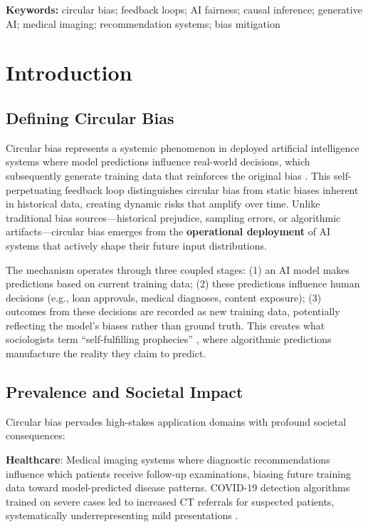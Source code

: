 \documentclass[11pt,a4paper]{article}
\begin{document}
\begin{abstract}
\end{abstract}

\noindent\textbf{Keywords:} circular bias; feedback loops; AI fairness; causal inference; generative AI; medical imaging; recommendation systems; bias mitigation

\section{Introduction}

\subsection{Defining Circular Bias}

Circular bias represents a systemic phenomenon in deployed artificial intelligence systems where model predictions influence real-world decisions, which subsequently generate training data that reinforces the original bias \cite{mehrabi2021}. This self-perpetuating feedback loop distinguishes circular bias from static biases inherent in historical data, creating dynamic risks that amplify over time. Unlike traditional bias sources—historical prejudice, sampling errors, or algorithmic artifacts—circular bias emerges from the \textbf{operational deployment} of AI systems that actively shape their future input distributions.

The mechanism operates through three coupled stages: (1) an AI model makes predictions based on current training data; (2) these predictions influence human decisions (e.g., loan approvals, medical diagnoses, content exposure); (3) outcomes from these decisions are recorded as new training data, potentially reflecting the model's biases rather than ground truth. This creates what sociologists term ``self-fulfilling prophecies'' \cite{mehrabi2021}, where algorithmic predictions manufacture the reality they claim to predict.

\subsection{Prevalence and Societal Impact}

Circular bias pervades high-stakes application domains with profound societal consequences:

\textbf{Healthcare}: Medical imaging systems where diagnostic recommendations influence which patients receive follow-up examinations, biasing future training data toward model-predicted disease patterns. COVID-19 detection algorithms trained on severe cases led to increased CT referrals for suspected patients, systematically underrepresenting mild presentations \cite{varoquaux2022}.
\end{document}
